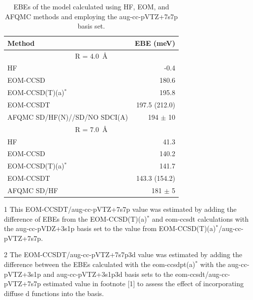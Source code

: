 \begin{table}[ht!]
    \caption{\label{tab:EOM} EBEs of the  model calculated using HF, EOM, and AFQMC methods and employing the aug-cc-pVTZ+7s7p basis set.}
\begin{threeparttable}
\begin{tabular*}{\textwidth}{l@{\extracolsep{\fill}}r}
Method & EBE (meV)                               \\
\hline
\multicolumn{2}{c}{R = \SI{4.0}{\angstrom}}     \\ 
HF            & -0.4        \\
EOM-CCSD      & 180.6          \\
EOM-CCSD(T)(a)$^*$ & 195.8          \\
    EOM-CCSDT     & 197.5\tnote{1}
    (212.0)\tnote{2} \\
AFQMC SD/HF(N)//SD/NO SDCI(A)     & 194 $\pm$ 10 \\ \hline
\multicolumn{2}{c}{R = \SI{7.0}{\angstrom}}                    \\ 
HF            & 41.3        \\
EOM-CCSD      & 140.2    \\
EOM-CCSD(T)(a)$^*$ & 141.7    \\
EOM-CCSDT    & 143.3\tnote{1}  (154.2)\tnote{2}     \\
AFQMC SD/HF     & 181 $\pm$ 5 \\ 
\end{tabular*}
\begin{tablenotes}
\item[1] This EOM-CCSDT/aug-cc-pVTZ+7s7p value was estimated by adding the difference of EBEs from the EOM-CCSD(T)(a)$^*$ and eom-ccsdt calculations with the aug-cc-pVDZ+3s1p basis set to the value from EOM-CCSD(T)(a)$^*$/aug-cc-pVTZ+7s7p.
\item[2] The EOM-CCSDT/aug-cc-pVTZ+7s7p3d value was estimated by adding the difference between the EBEs calculated with the eom-ccsdpt(a)$^*$ with the aug-cc-pVTZ+3s1p and aug-cc-pVTZ+3s1p3d basis sets to the eom-ccsdt/aug-cc-pVTZ+7s7p estimated value in footnote [1] to assess the effect of incorporating diffuse d functions into the basis.
\end{tablenotes}
\end{threeparttable}
\end{table}

